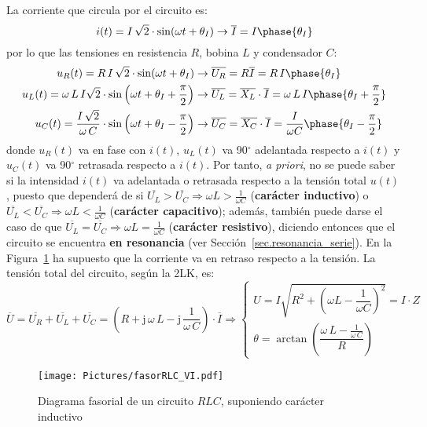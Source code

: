 \documentclass[11pt]{book} %
\numberwithin{dummy}{section}
\theoremstyle{ocrenumbox}
\theoremstyle{blacknumex}
\theoremstyle{blacknumbox}
\theoremstyle{ocrenum}
\newlength\esp
\begin{document}
	La corriente que circula por el circuito es:
	\begin{equation*}
		i(t)=I\,\sqrt{2}\cdot\sin(\omega t+\theta_I)\rightarrow\overline{I}=I\phase{\theta_I}
	\end{equation*}
	por lo que las tensiones en resistencia $R$, bobina $L$ y condensador $C$:
	\begin{align*}
		u_R(t)=R\, I\,\sqrt{2}\cdot\sin(\omega t+\theta_I)&\rightarrow \overline{U_R} = R \overline{I}=R\,I\phase{\theta_I}\\ 
		u_L(t)= \omega\,L\,I \sqrt{2}\cdot \sin \left(\omega t+\theta_I+\frac{\pi}{2}\right)&\rightarrow \overline{U_L}=\overline{X_L}\cdot\overline{I}= \omega\,L\,I\phase{\theta_I+\frac{\pi}{2}}\\
		u_C(t)=\dfrac{I\,\sqrt{2}}{\omega\,C} \cdot \sin \left(\omega t+\theta_I-\frac{\pi}{2}\right)&\rightarrow \overline{U_C}=\overline{X_C}\cdot\overline{I}=\dfrac{I}{\omega C}\phase{\theta_I-\frac{\pi}{2}}
	\end{align*}
	donde $u_R(t)$ va en fase con $i(t)$, $u_L(t)$ va 90$^\circ$ adelantada respecto a $i(t)$ y $u_C(t)$ va 90$^\circ$ retrasada respecto a $i(t)$. Por tanto, \textit{a priori}, no se puede saber si la intensidad $i(t)$ va {adelantada o retrasada} respecto a la tensión total $u(t)$, puesto que dependerá de si $\overline{U_L}>\overline{U_C}\Rightarrow \omega L>\frac{1}{\omega C}$ (\textbf{carácter inductivo}) o $\overline{U_L}<\overline{U_C}\Rightarrow \omega L<\frac{1}{\omega C}$ (\textbf{carácter capacitivo}); además, también puede darse el caso de que $\overline{U_L}=\overline{U_C}\Rightarrow \omega L=\frac{1}{\omega C}$ (\textbf{carácter resistivo}), diciendo entonces que el circuito se encuentra \textbf{en resonancia} (ver Sección~\ref{sec.resonancia_serie}). En la Figura~\ref{fig.fasorRLC_VI} ha supuesto que la corriente va en retraso respecto a la tensión. La tensión total del circuito, según la 2LK, es:  
	\begin{equation*}
		\overline{U} = \overline{U_R} +\overline{U_L} + \overline{U_C} =\left(R+\mathrm{j}\,\omega\,L - \mathrm{j}\,\dfrac{1}{\omega\,C}\right) \cdot \overline{I}\Rightarrow 
		\begin{cases}
			U=I\sqrt{R^2 + \left(\omega L - \dfrac{1}{\omega C}\right)^2}=I\cdot Z\\
			\theta=\arctan\left( \dfrac{\omega\,L-\frac{1}{\omega\,C}}{R}\right)
		\end{cases}
	\end{equation*}
	
	\begin{figure}[htbp]
		\centering \texttt{[image: Pictures/fasorRLC\_VI.pdf]}
		\caption{Diagrama fasorial de un circuito $RLC$, suponiendo carácter inductivo}
		\label{fig.fasorRLC_VI}
	\end{figure}
	
\end{document}
